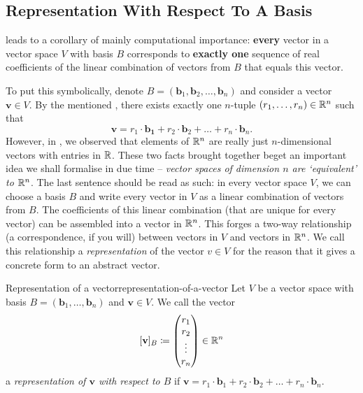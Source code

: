 \subsection{Representation With Respect To A Basis}
\label{ssec:representation-with-respect-to-a-basis}

 leads to a corollary of mainly
computational importance: \textbf{every} vector in a vector space $V$ with basis
$B$ corresponds to \textbf{exactly one} sequence of real coefficients of the
linear combination of vectors from $B$ that equals this vector.

To put this symbolically, denote $B =
(\mathbf{b}_1,\mathbf{b}_2,\ldots,\mathbf{b}_n)$ and consider a vector
$\mathbf{v} \in V$. By the mentioned
, there exists exactly one
$n$-tuple $(r_1,\ldots,r_n) \in \mathbb{R}^{n}$ such that
\[
 \mathbf{v} = r_1 \cdot \mathbf{b_1} + r_2 \cdot \mathbf{b}_2 + \ldots + r_n
 \cdot \mathbf{b}_n.
\]
However, in , we observed that elements of
$\mathbb{R}^{n}$ are really just $n$-dimensional vectors with entries in $\mathbb{R}$. These two
facts brought together beget an important idea we shall formalise in due time --
\emph{vector spaces of dimension $n$ are `equivalent' to $\mathbb{R}^{n}$}. The last
sentence should be read as such: in every vector space $V$, we can choose a
basis $B$ and write every vector in $V$ as a linear combination of vectors from
$B$. The coefficients of this linear combination (that are unique for every
vector) can be assembled into a vector in $\mathbb{R}^{n}$. This forges a two-way
relationship (a correspondence, if you will) between vectors in $V$ and vectors
in $\mathbb{R}^{n}$. We call this relationship a \emph{representation} of the vector
$v \in V$ for the reason that it gives a concrete form to an abstract vector.

\begin{definition}{Representation of a vector}{representation-of-a-vector}
 Let $V$ be a vector space with basis $B = (\mathbf{b}_1,\ldots,\mathbf{b}_n)$
 and $\mathbf{v} \in V$. We call the vector
 \[
  [\mathbf{v}]_B \coloneqq
  \begin{pmatrix}
   r_1\\
   r_2\\
   \vdots\\
   r_n
  \end{pmatrix}
 \in \mathbb{R}^{n}
 \]
 a \emph{representation of $\mathbf{v}$ with respect to $B$} if $\mathbf{v} =
 r_1 \cdot \mathbf{b}_1 + r_2 \cdot \mathbf{b}_2 + \ldots + r_n \cdot
 \mathbf{b}_n$.
\end{definition}

